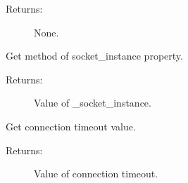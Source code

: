 \documentclass[letterpaper,10pt,english]{sphinxmanual}
\begin{document}
\begin{fulllineitems}
\begin{fulllineitems}
\begin{description}
\item[{Returns:}] \leavevmode
\sphinxAtStartPar
None.

\end{description}

\end{fulllineitems}


\begin{fulllineitems}
\label{\detokenize{QConnectBase:QConnectBase.tcp.tcp_base.TCPBase.socket_instance}}
\sphinxAtStartPar
Get method of socket\_instance property.
\begin{description}
\item[{Returns:}] \leavevmode
\sphinxAtStartPar
Value of \_socket\_instance.

\end{description}

\end{fulllineitems}


\begin{fulllineitems}
\label{\detokenize{QConnectBase:QConnectBase.tcp.tcp_base.TCPBase.timeout}}
\sphinxAtStartPar
Get connection timeout value.
\begin{description}
\item[{Returns:}] \leavevmode
\sphinxAtStartPar
Value of connection timeout.

\end{description}

\end{fulllineitems}


\end{fulllineitems}

\end{document}
